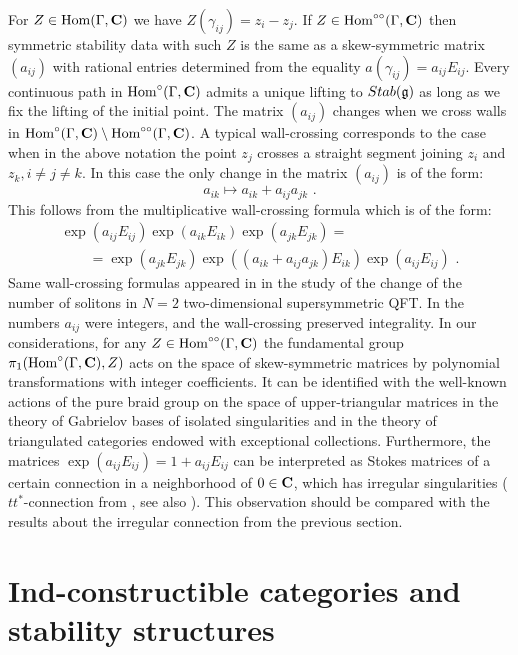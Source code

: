 \documentclass[12pt]{article}
\begin{document}
For $Z\in \operatorname{Hom}(\Gamma,{\bf C})$ we have $Z(\gamma_{ij})=z_i-z_j$. If $Z\in \operatorname{Hom}^{\circ\circ}(\Gamma,{\bf C})$ then symmetric stability data with such $Z$ is the same as a skew-symmetric matrix $(a_{ij})$ with rational entries determined from the equality $a(\gamma_{ij})=a_{ij}E_{ij}$. Every continuous path in $\operatorname{Hom}^\circ(\Gamma,{\bf C})$ admits a unique lifting to $Stab({\mathfrak g})$ as long as we fix the lifting of the initial point. The matrix $(a_{ij})$ changes when we cross walls in  $\operatorname{Hom}^\circ(\Gamma,{\bf C})\setminus \operatorname{Hom}^{\circ\circ}(\Gamma,{\bf C})$. A typical wall-crossing corresponds to the case when in the above notation the point $z_j$ crosses a straight segment joining $z_i$ and $z_k, i\ne j\ne k$. In this case the only change in the matrix $(a_{ij})$ is of the form:
$$a_{ik}\mapsto a_{ik}+a_{ij}a_{jk}\,\,.$$
This follows from the multiplicative wall-crossing formula which is of the form:
$$\begin{array}{l}\exp(a_{ij}E_{ij})\exp(a_{ik}E_{ik})\exp(a_{jk}E_{jk})=\\
\qquad{}=\exp(a_{jk}E_{jk})\exp((a_{ik}+a_{ij}a_{jk})E_{ik})\exp(a_{ij}E_{ij})\,\,.
\end{array}$$
Same wall-crossing formulas appeared in \cite{CeVa} in the study of the change of the number of solitons in $N=2$ two-dimensional supersymmetric QFT. In \cite{CeVa} the numbers $a_{ij}$ were integers, and the wall-crossing preserved integrality. In our considerations, for any $Z\in \operatorname{Hom}^{\circ\circ}(\Gamma,{\bf C})$ the fundamental group
$\pi_1(\operatorname{Hom}^\circ(\Gamma,{\bf C}),Z)$ acts on the space of skew-symmetric matrices by polynomial transformations with integer coefficients. It can be identified with the well-known actions of the pure braid group on the space of upper-triangular matrices in the theory of Gabrielov bases of isolated singularities and in the theory of triangulated categories endowed with exceptional collections. Furthermore, the matrices $\exp(a_{ij}E_{ij})=1+a_{ij}E_{ij}$ can be interpreted as Stokes matrices of a certain connection in a neighborhood of $0\in {\bf C}$, which has irregular singularities ($tt^{\ast}$-connection from \cite{CeVa}, see also \cite{GaMNeit}). This observation should be compared with the results about the irregular connection from the previous section.

\section{Ind-constructible categories and stability structures}
\end{document}
